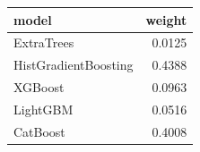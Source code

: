 \begin{tabular}{lr}
\toprule
model & weight \\
\midrule
ExtraTrees & 0.0125 \\
HistGradientBoosting & 0.4388 \\
XGBoost & 0.0963 \\
LightGBM & 0.0516 \\
CatBoost & 0.4008 \\
\bottomrule
\end{tabular}
